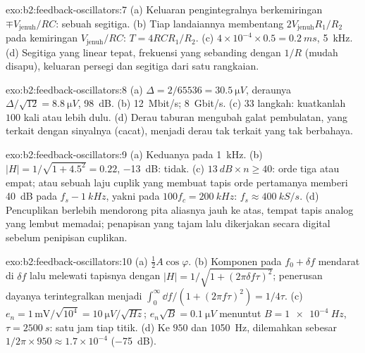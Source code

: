\begin{solution}{exo:b2:feedback-oscillators:7}
(a) Keluaran pengintegralnya berkemiringan $\mp V_{\text{jenuh}}/RC$: sebuah segitiga. (b)
Tiap landaiannya membentang $2V_{\text{jenuh}}R_1/R_2$ pada kemiringan $V_{\text{jenuh}}/RC$: $T = 4RCR_1/R_2$.
(c) $4 \times 10^{-4} \times 0.5 = \qty{0.2}{ms}$, \qty{5}{kHz}. (d) Segitiga yang
linear tepat, frekuensi yang sebanding dengan $1/R$ (mudah disapu), keluaran persegi dan
segitiga dari satu rangkaian.
\end{solution}

\begin{solution}{exo:b2:feedback-oscillators:8}
(a) $\Delta = 2/65536 = \qty{30.5}{\micro V}$, deraunya $\Delta/\sqrt{12} = \qty{8.8}{\micro V}$,
\qty{98}{dB}. (b) \qty{12}{Mbit/s}; \qty{8}{Gbit/s}. (c) $33$ langkah: kuatkanlah
$100$ kali atau lebih dulu. (d) Derau taburan mengubah galat pembulatan, yang terkait
dengan sinyalnya (cacat), menjadi derau tak terkait yang tak berbahaya.
\end{solution}

\begin{solution}{exo:b2:feedback-oscillators:9}
(a) Keduanya pada \qty{1}{kHz}. (b) $|H| = 1/\sqrt{1 + 4.5^2} = 0.22$, \qty{-13}{dB}: tidak. (c)
$\qty{13}{dB} \times n \ge 40$: orde tiga atau empat; atau sebuah laju cuplik yang
membuat tapis orde pertamanya memberi \qty{40}{dB} pada $f_s - \qty{1}{kHz}$, yakni pada
$100f_c = \qty{200}{kHz}$: $f_s \approx \qty{400}{kS/s}$. (d) Pencuplikan berlebih mendorong
pita aliasnya jauh ke atas, tempat tapis analog yang lembut memadai; penapisan yang tajam
lalu dikerjakan secara digital sebelum penipisan cuplikan.
\end{solution}

\begin{solution}{exo:b2:feedback-oscillators:10}
(a) $\tfrac12A\cos\varphi$. (b) Komponen pada $f_0 + \delta f$ mendarat di $\delta f$
lalu melewati tapisnya dengan $|H| = 1/\sqrt{1 + (2\pi\delta f\tau)^2}$; penerusan
dayanya terintegralkan menjadi $\int_0^\infty\dd f/(1 + (2\pi f\tau)^2) = 1/4\tau$.
(c) $e_n = 1\,\text{mV}/\sqrt{10^4} = \qty{10}{\micro V/\sqrt{Hz}}$; $e_n\sqrt B = \qty{0.1}{\micro V}$
menuntut $B = \qty{1e-4}{Hz}$, $\tau = \qty{2500}{s}$: satu jam tiap titik. (d) Ke $950$
dan \qty{1050}{Hz}, dilemahkan sebesar $1/2\pi \times 950 \approx 1.7 \times 10^{-4}$ (\qty{-75}{dB}).
\end{solution}

